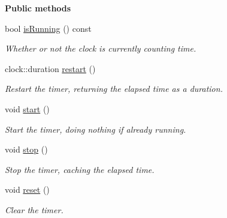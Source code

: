 \begin{Indent}\textbf{ Public methods}\par
\begin{DoxyCompactItemize}
\item 
\mbox{\label{classrev_1_1_timer_a100d03e0d65505a158ac447c293ea3ca}} 
bool \mbox{\hyperlink{classrev_1_1_timer_a100d03e0d65505a158ac447c293ea3ca}{is\+Running}} () const
\begin{DoxyCompactList}\small\item\em Whether or not the clock is currently counting time. \end{DoxyCompactList}\item 
\mbox{\label{classrev_1_1_timer_a247793f1c050d292f160fe1a4717e0ce}} 
clock\+::duration \mbox{\hyperlink{classrev_1_1_timer_a247793f1c050d292f160fe1a4717e0ce}{restart}} ()
\begin{DoxyCompactList}\small\item\em Restart the timer, returning the elapsed time as a duration. \end{DoxyCompactList}\item 
\mbox{\label{classrev_1_1_timer_ab77f3545151315d5db1ce291d895b0c0}} 
void \mbox{\hyperlink{classrev_1_1_timer_ab77f3545151315d5db1ce291d895b0c0}{start}} ()
\begin{DoxyCompactList}\small\item\em Start the timer, doing nothing if already running. \end{DoxyCompactList}\item 
\mbox{\label{classrev_1_1_timer_ac2d4a466ecb7e182db8bf82410e8ffae}} 
void \mbox{\hyperlink{classrev_1_1_timer_ac2d4a466ecb7e182db8bf82410e8ffae}{stop}} ()
\begin{DoxyCompactList}\small\item\em Stop the timer, caching the elapsed time. \end{DoxyCompactList}\item 
\mbox{\label{classrev_1_1_timer_a6029675724cda6f21f5a344526bb1ca0}} 
void \mbox{\hyperlink{classrev_1_1_timer_a6029675724cda6f21f5a344526bb1ca0}{reset}} ()
\begin{DoxyCompactList}\small\item\em Clear the timer. \end{DoxyCompactList}\item 

\end{DoxyCompactItemize}
\end{Indent}
